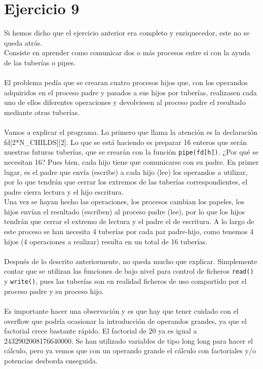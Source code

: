 \documentclass[12pt]{article}
\begin{document}
\section{Ejercicio 9}
Si hemos dicho que el ejercicio anterior era completo y enriquecedor, este no se queda atrás.\\ Consiste en aprender como comunicar dos o más procesos entre si con la ayuda de las tuberías o pipes.\\\\
El problema pedía que se crearan cuatro procesos hijos que, con los operandos adquiridos en el proceso padre y pasados a sus hijos por tuberías, realizasen cada uno de ellos diferentes operaciones y devolviesen al proceso padre el resultado mediante otras tuberías.\\\\
Vamos a explicar el programa. Lo primero que llama la atención es la declaración fd[2*N\_CHILDS][2]. Lo que se está haciendo es preparar 16 enteros que serán nuestras futuras tuberías, que se crearán con la función \texttt{pipe(fd[h])}. ¿Por qué se necesitan 16? Pues bien, cada hijo tiene que comunicarse con su padre. En primer lugar, es el padre que envía (escribe) a cada hijo (lee) los operandos a utilizar, por lo que tendrán que cerrar los extremos de las tuberías correspondientes, el padre cierra lectura y el hijo escritura.\\Una vez se hayan hecho las operaciones, los procesos cambian los papeles, los hijos envían el resultado (escriben) al proceso padre (lee), por lo que los hijos tendrán que cerrar el extremo de lectura y el padre el de escritura. A lo largo de este proceso se han necesita 4 tuberías por cada par padre-hijo, como tenemos 4 hijos (4 operaciones a realizar) resulta en un total de 16 tuberías.\\\\
Después de lo descrito anteriormente, no queda mucho que explicar. Simplemente contar que se utilizan las funciones de bajo nivel para control de ficheros \texttt{read()} y \texttt{write()}, pues las tuberías son en realidad ficheros de uso compartido por el proceso padre y su proceso hijo.\\\\
Es importante hacer una observación y es que hay que tener cuidado con el overflow que podría ocasionar la introducción de operandos grandes, ya que el factorial crece bastante rápido. El factorial de 20 ya es igual a 2432902008176640000. Se han utilizado variables de tipo long long para hacer el cálculo, pero ya vemos que con un operando grande el cálculo con factoriales y/o potencias desborda enseguida. 
\end{document}
